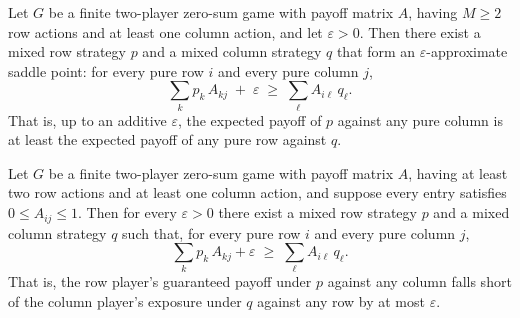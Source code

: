 \begin{theorem}
\label{approx_minimax}
\leanok
{}
Let $G$ be a finite two-player zero-sum game with payoff matrix $A$, having $M \ge 2$
row actions and at least one column action, and let $\varepsilon > 0$. Then there exist
a mixed row strategy $p$ and a mixed column strategy $q$ that form an
$\varepsilon$-approximate saddle point: for every pure row $i$ and every pure column
$j$,
\[
  \sum_{k} p_k\, A_{kj} \;+\; \varepsilon \;\ge\; \sum_{\ell} A_{i\ell}\, q_\ell .
\]
That is, up to an additive $\varepsilon$, the expected payoff of $p$ against any pure
column is at least the expected payoff of any pure row against $q$.
\end{theorem}

\begin{theorem}
\label{minimax_approx_theorem}
\leanok
{}
Let $G$ be a finite two-player zero-sum game with payoff matrix $A$, having at least two
row actions and at least one column action, and suppose every entry satisfies $0 \le
A_{ij} \le 1$. Then for every $\varepsilon > 0$ there exist a mixed row strategy $p$ and
a mixed column strategy $q$ such that, for every pure row $i$ and every pure column $j$,
\[
  \sum_{k} p_k \, A_{kj} + \varepsilon \;\ge\; \sum_{\ell} A_{i\ell} \, q_\ell.
\]
That is, the row player's guaranteed payoff under $p$ against any column falls short of
the column player's exposure under $q$ against any row by at most $\varepsilon$.
\end{theorem}
